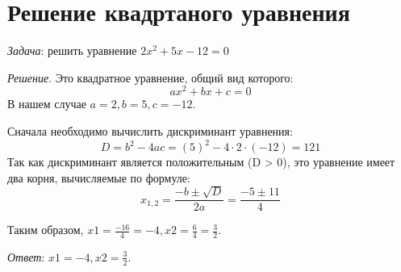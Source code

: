 \documentclass{article}
\begin{document}
\section{Решение квадртаного уравнения}

{\it Задача}: решить уравнение $2x^2 + 5x - 12 = 0$

{\it Решение}. Это квадратное уравнение, общий вид которого:
$$ax^2 + bx + c = 0$$
В нашем случае $a = 2, b = 5, c = -12.$

    Сначала необходимо вычислить дискриминант уравнения:
$$D = b^{2} - 4ac = (5)^{2} - 4 \cdot 2 \cdot (-12) = 121$$
Так как дискриминант является положительным (D > 0), это уравнение
имеет два корня, вычисляемые по формуле:
$$x_{1,2} = \frac{-b \pm \sqrt{D}}{2a} = \frac{-5 \pm 11}{4}$$

Таким образом, $x1 = \frac{-16}{4} = -4, x2 = \frac{6}{4} = \frac{3}{2}$.

{\it Ответ}: $x1 = -4, x2 = \frac{3}{2}$.
\end{document}
